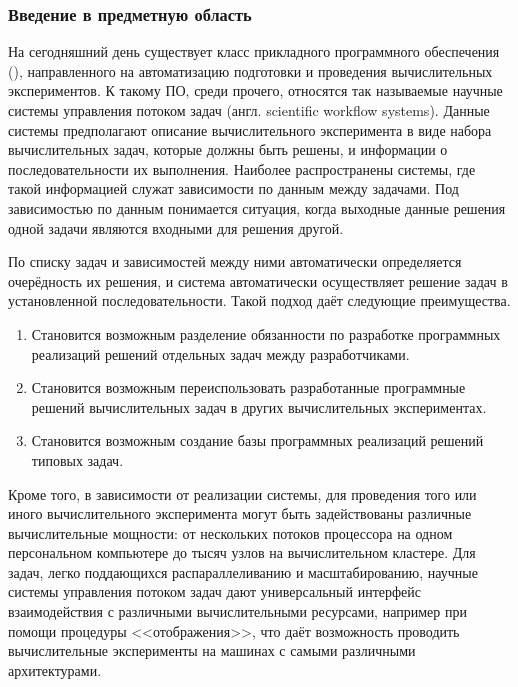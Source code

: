 \def\notedate{2023.01.07}
\def\currentauthor{Тришин И.В. (РК6-11М)}
\subsubsection{Введение в предметную область}
На сегодняшний день существует класс прикладного программного обеспечения (), направленного на автоматизацию подготовки и проведения вычислительных экспериментов. К такому ПО, среди прочего, относятся так называемые научные системы управления потоком задач (англ. scientific workflow systems). Данные системы предполагают описание вычислительного эксперимента в виде набора вычислительных задач, которые должны быть решены, и информации о последовательности их выполнения. Наиболее распространены системы, где такой информацией служат зависимости по данным между задачами. Под зависимостью по данным понимается ситуация, когда выходные данные решения одной задачи являются входными для решения другой.

По списку задач и зависимостей между ними автоматически определяется очерёдность их решения, и система автоматически осуществляет решение задач в установленной последовательности. Такой подход даёт следующие преимущества. 
\begin{enumerate}
	\item Становится возможным разделение обязанности по разработке программных реализаций решений отдельных задач между разработчиками.
	\item Становится возможным переиспользовать разработанные программные решений вычислительных задач в других вычислительных экспериментах.
	\item Становится возможным создание базы программных реализаций решений типовых задач.
\end{enumerate}
 
Кроме того, в зависимости от реализации системы, для проведения того или иного вычислительного эксперимента могут быть задействованы различные вычислительные мощности: от нескольких потоков процессора на одном персональном компьютере до тысяч узлов на вычислительном кластере. Для задач, легко поддающихся распараллеливанию и масштабированию, научные системы управления потоком задач дают универсальный интерфейс взаимодействия с различными вычислительными ресурсами, например при помощи процедуры <<отображения>>\cite{DeelmanWorkflow2009}, что даёт возможность проводить вычислительные эксперименты на машинах с самыми различными архитектурами.

